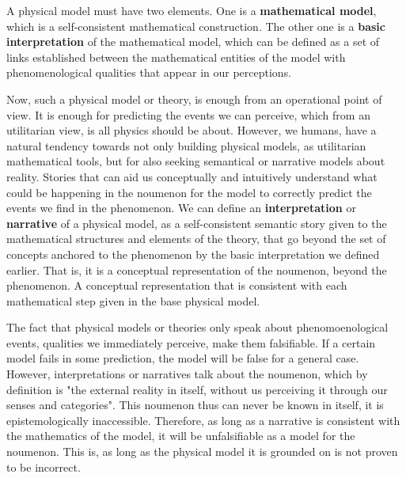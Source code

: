 \documentclass[11pt, a4paper]{article} %
\begin{document}
A physical model must have two elements. One is a {\bf mathematical model}, which is a self-consistent mathematical construction. The other one is a {\bf basic interpretation} of the mathematical model, which can be defined as a set of links established between the mathematical entities of the model with phenomenological qualities that appear in our perceptions.

Now, such a physical model or theory, is enough from an operational point of view. It is enough for predicting the events we can perceive, which from an utilitarian view, is all physics should be about. However, we humans, have a natural tendency towards not only building physical models, as utilitarian mathematical tools, but for also seeking semantical or narrative models about reality. Stories that can aid us conceptually and intuitively understand what could be happening in the noumenon for the model to correctly predict the events we find in the phenomenon. We can define an {\bf interpretation} or {\bf narrative} of a physical model, as a self-consistent semantic story given to the mathematical structures and elements of the theory, that go beyond the set of concepts anchored to the phenomenon by the basic interpretation we defined earlier. That is, it is a conceptual representation of the noumenon, beyond the phenomenon. A conceptual representation that is consistent with each mathematical step given in the base physical model. 

The fact that physical models or theories only speak about phenomoenological events, qualities we immediately perceive, make them falsifiable. If a certain model fails in some prediction, the model will be false for a general case. However, interpretations or narratives talk about the noumenon, which by definition is "the external reality in itself, without us perceiving it through our senses and categories". This noumenon thus can never be known in itself, it is epistemologically inaccessible. Therefore, as long as a narrative is consistent with the mathematics of the model, it will be unfalsifiable as a model for the noumenon. This is, as long as the physical model it is grounded on is not proven to be incorrect.
\end{document}
